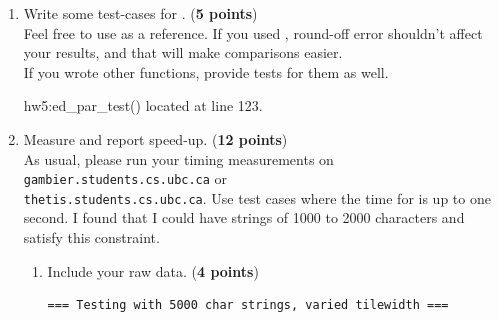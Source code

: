 \documentclass{article}
\newenvironment{answer}
{\par\color{blue}}
{\normalfont\par}
\begin{document}
\begin{enumerate}
\begin{enumerate}
\begin{answer}
                        The master process initializes the chain with operation costs and left column segments,
                        then feeds the top row segments (representing string S2) one at a time to the first
                        worker. Each segment propagates through the chain as workers compute their respective
                        tiles. The final edit distance is extracted from the last element of the bottom
                        row produced by the final worker after processing the last tile column. This approach
                        achieves parallelism while amortizing communication costs through tile-based
                        computation, as each worker performs `TileHeight × TileWidth` operations between
                        communications.
                    \end{answer}
              \item Write some test-cases for . (\textbf{5 points})\\
                    Feel free to use  as a reference.
                    If you used , round-off error shouldn't affect your
                    results, and that will make comparisons easier.\\
                    If you wrote other functions, provide tests for them as well.
                    \begin{answer}
                        hw5:ed\_par\_test() located at line 123.
                    \end{answer}
              \item Measure and report speed-up. (\textbf{12 points})\\
                    As usual, please run your timing measurements on
                    \texttt{gambier.students.cs.ubc.ca} or\\
                    \texttt{thetis.students.cs.ubc.ca}.
                    Use test cases where the time for  is up to one second.
                    I found that I could have strings of 1000 to 2000 characters and satisfy this constraint.
                    \begin{enumerate}
                        \item Include your raw data. (\textbf{4 points})
                              \begin{answer}
                                  \begin{verbatim}
=== Testing with 5000 char strings, varied tilewidth ===


\end{verbatim}
\end{answer}
\end{enumerate}
\end{enumerate}
\end{enumerate}
\end{document}
